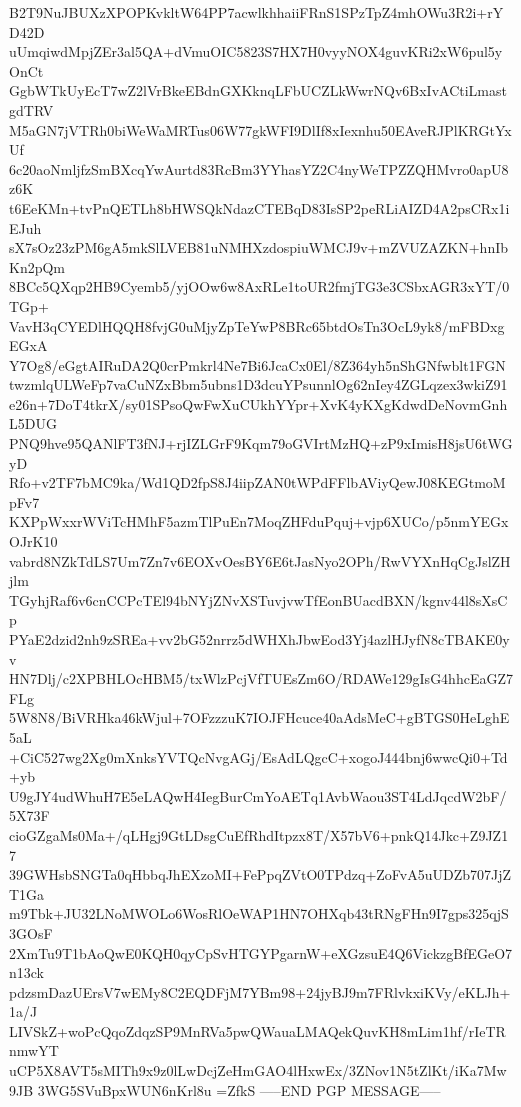 B2T9NuJBUXzXPOPKvkltW64PP7acwlkhhaiiFRnS1SPzTpZ4mhOWu3R2i+rYD42D
uUmqiwdMpjZEr3al5QA+dVmuOIC5823S7HX7H0vyyNOX4guvKRi2xW6pul5yOnCt
GgbWTkUyEcT7wZ2lVrBkeEBdnGXKknqLFbUCZLkWwrNQv6BxIvACtiLmastgdTRV
M5aGN7jVTRh0biWeWaMRTus06W77gkWFI9DlIf8xIexnhu50EAveRJPlKRGtYxUf
6c20aoNmljfzSmBXcqYwAurtd83RcBm3YYhasYZ2C4nyWeTPZZQHMvro0apU8z6K
t6EeKMn+tvPnQETLh8bHWSQkNdazCTEBqD83IsSP2peRLiAIZD4A2psCRx1iEJuh
sX7sOz23zPM6gA5mkSlLVEB81uNMHXzdospiuWMCJ9v+mZVUZAZKN+hnIbKn2pQm
8BCc5QXqp2HB9Cyemb5/yjOOw6w8AxRLe1toUR2fmjTG3e3CSbxAGR3xYT/0TGp+
VavH3qCYEDlHQQH8fvjG0uMjyZpTeYwP8BRc65btdOsTn3OcL9yk8/mFBDxgEGxA
Y7Og8/eGgtAIRuDA2Q0crPmkrl4Ne7Bi6JcaCx0El/8Z364yh5nShGNfwblt1FGN
twzmlqULWeFp7vaCuNZxBbm5ubns1D3dcuYPsunnlOg62nIey4ZGLqzex3wkiZ91
e26n+7DoT4tkrX/sy01SPsoQwFwXuCUkhYYpr+XvK4yKXgKdwdDeNovmGnhL5DUG
PNQ9hve95QANlFT3fNJ+rjIZLGrF9Kqm79oGVIrtMzHQ+zP9xImisH8jsU6tWGyD
Rfo+v2TF7bMC9ka/Wd1QD2fpS8J4iipZAN0tWPdFFlbAViyQewJ08KEGtmoMpFv7
KXPpWxxrWViTcHMhF5azmTlPuEn7MoqZHFduPquj+vjp6XUCo/p5nmYEGxOJrK10
vabrd8NZkTdLS7Um7Zn7v6EOXvOesBY6E6tJasNyo2OPh/RwVYXnHqCgJslZHjlm
TGyhjRaf6v6cnCCPcTEl94bNYjZNvXSTuvjvwTfEonBUacdBXN/kgnv44l8sXsCp
PYaE2dzid2nh9zSREa+vv2bG52nrrz5dWHXhJbwEod3Yj4azlHJyfN8cTBAKE0yv
HN7Dlj/c2XPBHLOcHBM5/txWlzPcjVfTUEsZm6O/RDAWe129gIsG4hhcEaGZ7FLg
5W8N8/BiVRHka46kWjul+7OFzzzuK7IOJFHcuce40aAdsMeC+gBTGS0HeLghE5aL
+CiC527wg2Xg0mXnksYVTQcNvgAGj/EsAdLQgcC+xogoJ444bnj6wwcQi0+Td+yb
U9gJY4udWhuH7E5eLAQwH4IegBurCmYoAETq1AvbWaou3ST4LdJqcdW2bF/5X73F
cioGZgaMs0Ma+/qLHgj9GtLDsgCuEfRhdItpzx8T/X57bV6+pnkQ14Jkc+Z9JZ17
39GWHsbSNGTa0qHbbqJhEXzoMI+FePpqZVtO0TPdzq+ZoFvA5uUDZb707JjZT1Ga
m9Tbk+JU32LNoMWOLo6WosRlOeWAP1HN7OHXqb43tRNgFHn9I7gps325qjS3GOsF
2XmTu9T1bAoQwE0KQH0qyCpSvHTGYPgarnW+eXGzsuE4Q6VickzgBfEGeO7n13ck
pdzsmDazUErsV7wEMy8C2EQDFjM7YBm98+24jyBJ9m7FRlvkxiKVy/eKLJh+1a/J
LIVSkZ+woPcQqoZdqzSP9MnRVa5pwQWauaLMAQekQuvKH8mLim1hf/rIeTRnmwYT
uCP5X8AVT5sMITh9x9z0lLwDcjZeHmGAO4lHxwEx/3ZNov1N5tZlKt/iKa7Mw9JB
3WG5SVuBpxWUN6nKrl8u
=ZfkS
-----END PGP MESSAGE-----
